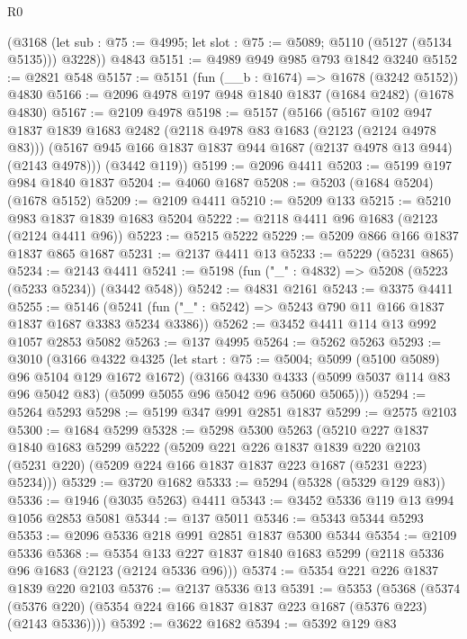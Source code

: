 \begin{lexlean}{R0}
\begin{coremodule}
      (@3168 (let sub : @75 := @4995; let slot : @75 := @5089; @5110 (@5127 (@5134 @5135))) @3228))
    @4843
@5151 := @4989 @949 @985 @793 @1842 @3240
@5152 := @2821 @548
@5157 := @5151 (fun (__b : @1674) => @1678 (@3242 @5152)) @4830
@5166 := @2096 @4978 @197 @948 @1840 @1837 (@1684 @2482) (@1678 @4830)
@5167 := @2109 @4978
@5198 := @5157
    (@5166
      (@5167
        @102
        @947
        @1837
        @1839
        @1683
        @2482
        (@2118 @4978 @83 @1683 (@2123 (@2124 @4978 @83)))
        (@5167 @945 @166 @1837 @1837 @944 @1687 (@2137 @4978 @13 @944) (@2143 @4978)))
      (@3442 @119))
@5199 := @2096 @4411
@5203 := @5199 @197 @984 @1840 @1837
@5204 := @4060 @1687
@5208 := @5203 (@1684 @5204) (@1678 @5152)
@5209 := @2109 @4411
@5210 := @5209 @133
@5215 := @5210 @983 @1837 @1839 @1683 @5204
@5222 := @2118 @4411 @96 @1683 (@2123 (@2124 @4411 @96))
@5223 := @5215 @5222
@5229 := @5209 @866 @166 @1837 @1837 @865 @1687
@5231 := @2137 @4411 @13
@5233 := @5229 (@5231 @865)
@5234 := @2143 @4411
@5241 := @5198 (fun ("_" : @4832) => @5208 (@5223 (@5233 @5234)) (@3442 @548))
@5242 := @4831 @2161
@5243 := @3375 @4411
@5255 := @5146
    (@5241 (fun ("_" : @5242) => @5243 @790 @11 @166 @1837 @1837 @1687 @3383 @5234 @3386))
@5262 := @3452 @4411 @114 @13 @992 @1057 @2853 @5082
@5263 := @137 @4995
@5264 := @5262 @5263
@5293 := @3010
    (@3166
      @4322
      @4325
      (let start : @75 := @5004; @5099 (@5100 @5089) @96 @5104 @129 @1672 @1672)
      (@3166
        @4330
        @4333
        (@5099 @5037 @114 @83 @96 @5042 @83)
        (@5099 @5055 @96 @5042 @96 @5060 @5065)))
@5294 := @5264 @5293
@5298 := @5199 @347 @991 @2851 @1837
@5299 := @2575 @2103
@5300 := @1684 @5299
@5328 := @5298
    @5300
    @5263
    (@5210
      @227
      @1837
      @1840
      @1683
      @5299
      @5222
      (@5209
        @221
        @226
        @1837
        @1839
        @220
        @2103
        (@5231 @220)
        (@5209 @224 @166 @1837 @1837 @223 @1687 (@5231 @223) @5234)))
@5329 := @3720 @1682
@5333 := @5294 (@5328 (@5329 @129 @83))
@5336 := @1946 (@3035 @5263) @4411
@5343 := @3452 @5336 @119 @13 @994 @1056 @2853 @5081
@5344 := @137 @5011
@5346 := @5343 @5344 @5293
@5353 := @2096 @5336 @218 @991 @2851 @1837 @5300 @5344
@5354 := @2109 @5336
@5368 := @5354 @133 @227 @1837 @1840 @1683 @5299 (@2118 @5336 @96 @1683 (@2123 (@2124 @5336 @96)))
@5374 := @5354 @221 @226 @1837 @1839 @220 @2103
@5376 := @2137 @5336 @13
@5391 := @5353
    (@5368 (@5374 (@5376 @220) (@5354 @224 @166 @1837 @1837 @223 @1687 (@5376 @223) (@2143 @5336))))
@5392 := @3622 @1682
@5394 := @5392 @129 @83

\end{coremodule}
\end{lexlean}
